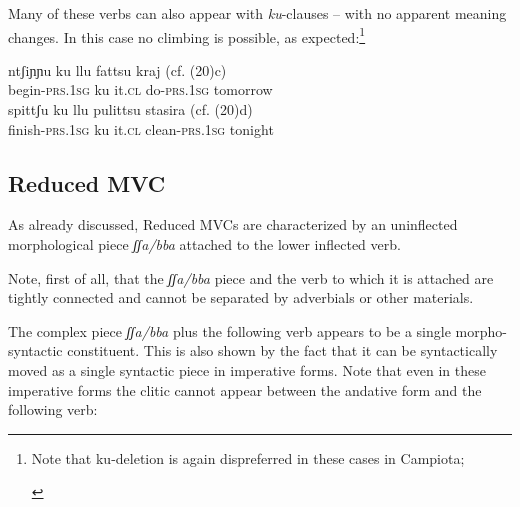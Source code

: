 \documentclass[output=paper]{langscibook}
\begin{document}
Many of these verbs can also appear with \textit{ku}-clauses -- with no apparent meaning changes. In this case no climbing is possible, as expected:\footnote{Note that ku-deletion is again dispreferred in these cases in Campiota;

\ea \label{fn10ex}
    \z
\z
}

\ea \label{ac21}
    \ea \label{ac21a}\gll ntʃiɲɲu     ku  llu   fattsu     kraj  (cf. (20)c) \\
     begin-\textsc{prs}.\textsc{1sg}  ku  it.\textsc{cl} do-\textsc{prs}.\textsc{1sg}  tomorrow\\
    \ex \label{ac21b}\gll spittʃu      ku  llu   pulittsu     stasira (cf. (20)d) \\
     finish-\textsc{prs}.\textsc{1sg} ku it.\textsc{cl} clean-\textsc{prs}.\textsc{1sg}  tonight\\
    \z
\z


\subsection{Reduced MVC}

As already discussed, Reduced MVCs are characterized by an uninflected morphological piece \textit{ʃʃa/bba} attached to the lower inflected verb.

Note, first of all, that the \textit{ʃʃa/bba} piece and the verb to which it is attached are tightly connected and cannot be separated by adverbials or other materials.

\ea \label{ac22}
  \z
\z

The complex piece \textit{ʃʃa/bba} plus the following verb appears to be a single morpho-syntactic constituent.  This is also shown by the fact that it can be syntactically moved as a single syntactic piece in imperative forms. Note that even in these imperative forms the clitic cannot appear between the andative form and the following verb:
\end{document}
